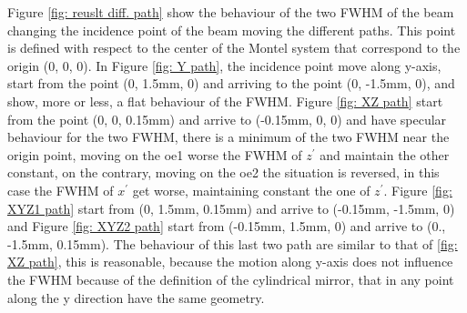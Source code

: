 Figure \ref{fig: reuslt diff. path} show the behaviour of the two FWHM of the beam changing the incidence point of the beam moving the different paths. This point is defined with respect to the center of the Montel system that correspond to the origin (0, 0, 0). In Figure \ref{fig: Y path}, the incidence point move along y-axis, start from the point (0, 1.5mm, 0) and arriving to the point (0, -1.5mm, 0), and show, more or less, a flat behaviour of the FWHM. Figure \ref{fig: XZ path} start from the point (0, 0, 0.15mm) and arrive to (-0.15mm, 0, 0) and have specular behaviour for the two FWHM, there is a minimum of the two FWHM near the origin point, moving on the oe1 worse the FWHM of $z^{'} $ and maintain the other constant, on the contrary, moving on the oe2 the situation is reversed, in this case the FWHM of $x^{'} $ get worse, maintaining constant the one of $z^{'} $. Figure \ref{fig: XYZ1 path} start from (0, 1.5mm, 0.15mm) and arrive to (-0.15mm, -1.5mm, 0) and Figure \ref{fig: XYZ2 path} start from (-0.15mm, 1.5mm, 0) and arrive to (0., -1.5mm, 0.15mm). The behaviour of this last two path are similar to that of \ref{fig: XZ path}, this is reasonable, because the motion along y-axis does not influence the FWHM because of the definition of the cylindrical mirror, that in any point along the y direction have the same geometry.
%
%
